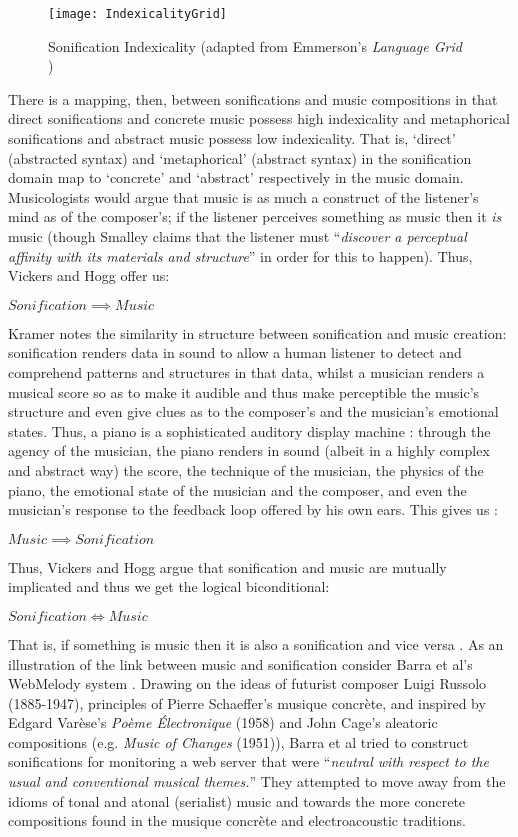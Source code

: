 \documentclass[runningheads]{llncs}
\begin{document}
\begin{figure}[hbt] 
\centering
\texttt{[image: IndexicalityGrid]} 
\caption{Sonification Indexicality (adapted from Emmerson's \emph{Language Grid} \cite{Emmerson:1986})} \label{fig:indexgrid} 
\end{figure} 
There is a mapping, then, between sonifications and music compositions in that direct sonifications and concrete music possess high indexicality and metaphorical sonifications and abstract music possess low indexicality. That is, `direct' (abstracted syntax) and `metaphorical' (abstract syntax) in the sonification domain map to `concrete' and `abstract' respectively in the music domain. Musicologists would argue that music is as much a construct of the listener’s mind as of the composer's; if the listener perceives something as music then it \emph{is} music (though Smalley \cite{Smalley:1986} claims that the listener must  ``\textit{discover a perceptual affinity with its materials and structure}'' in order for this to happen). Thus, Vickers and Hogg \cite{Vickers:2006a} offer us:
\begin{lemma} $Sonification \implies Music$\end{lemma}
Kramer \cite{Kramer:1994b} notes the similarity in structure between sonification and music creation: sonification renders data in sound to allow a human listener to detect and comprehend patterns and structures in that data, whilst a musician renders a musical score so as to make it audible and thus make perceptible the music's structure and even give clues as to the composer's and the musician's emotional states. Thus, a piano is a sophisticated auditory display machine \cite{Vickers:2006a}: through the agency of the musician, the piano renders in sound (albeit in a highly complex and abstract way) the score, the technique of the musician, the physics of the piano, the emotional state of the musician and the composer, and even the musician's response to the feedback loop offered by his own ears. This gives us \cite{Vickers:2006a}:
\begin{lemma}$Music \implies Sonification$\end{lemma}
Thus, Vickers and Hogg \cite{Vickers:2006a} argue that sonification and music are mutually implicated and thus we get the logical biconditional:
\begin{lemma}$Sonification \iff Music$\end{lemma}
That is, if something is music then it is also a sonification and vice versa \cite{Vickers:2006a}. As an illustration of the link between music and sonification consider Barra et al's {\sc WebMelody} system \cite{Barra:2002}. Drawing on the ideas of futurist composer Luigi Russolo (1885-1947), principles of Pierre Schaeffer's musique concrète, and inspired by Edgard Varèse's \textit{Poème Électronique} (1958) and John Cage's aleatoric compositions (e.g. \textit{Music of Changes} (1951)), Barra et al \cite{Barra:2002} tried to construct sonifications for monitoring a web server that were ``\textit{neutral with respect to the usual and conventional musical themes.}'' They attempted to move away from the idioms of tonal and atonal (serialist) music and towards the more concrete compositions found in the musique concrète and electroacoustic traditions. 
\end{document}

